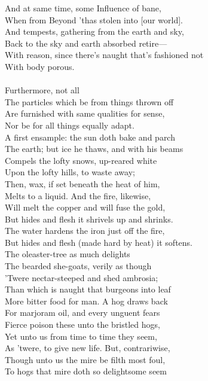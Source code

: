 And at same time, some Influence of bane,\\
When from Beyond 'thas stolen into [our world].\\
And tempests, gathering from the earth and sky,\\
Back to the sky and earth absorbed retire—\\
With reason, since there's naught that's fashioned not\\
With body porous.\\
\\
Furthermore, not all\\
The particles which be from things thrown off\\
Are furnished with same qualities for sense,\\
Nor be for all things equally adapt.\\
A first ensample: the sun doth bake and parch\\
The earth; but ice he thaws, and with his beams\\
Compels the lofty snows, up-reared white\\
Upon the lofty hills, to waste away;\\
Then, wax, if set beneath the heat of him,\\
Melts to a liquid. And the fire, likewise,\\
Will melt the copper and will fuse the gold,\\
But hides and flesh it shrivels up and shrinks.\\
The water hardens the iron just off the fire,\\
But hides and flesh (made hard by heat) it softens.\\
The oleaster-tree as much delights\\
The bearded she-goats, verily as though\\
'Twere nectar-steeped and shed ambrosia;\\
Than which is naught that burgeons into leaf\\
More bitter food for man. A hog draws back\\
For marjoram oil, and every unguent fears\\
Fierce poison these unto the bristled hogs,\\
Yet unto us from time to time they seem,\\
As 'twere, to give new life. But, contrariwise,\\
Though unto us the mire be filth most foul,\\
To hogs that mire doth so delightsome seem\\
